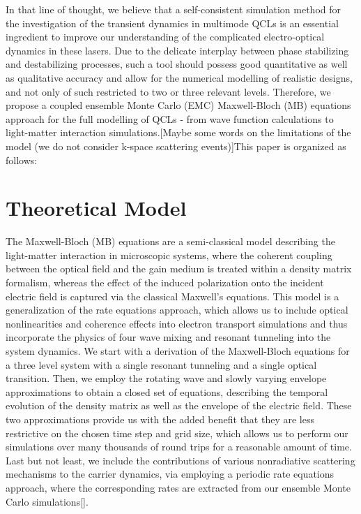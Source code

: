 \documentclass[10pt,letterpaper]{article}
\begin{document}
In that line of thought, we believe that a self-consistent simulation method for the investigation of the transient dynamics in multimode QCLs is an essential ingredient to improve our understanding of the complicated electro-optical dynamics in these lasers. Due to the delicate interplay between phase stabilizing and destabilizing processes, such a tool should possess good quantitative as well as qualitative accuracy and allow for the numerical modelling of realistic designs, and not only of such restricted to two or three relevant levels. Therefore, we propose a coupled ensemble Monte Carlo (EMC) Maxwell-Bloch (MB) equations approach for the full modelling of QCLs - from wave function calculations to light-matter interaction simulations.[Maybe some words on the limitations of the model (we do not consider k-space scattering events)]This paper is organized as follows:

\section{Theoretical Model}

The Maxwell-Bloch (MB) equations are a semi-classical model describing the light-matter interaction in microscopic systems, where the coherent coupling between the optical field and the gain medium is treated within a density matrix formalism, whereas the effect of the induced polarization onto the incident electric field is captured via the classical Maxwell's equations. This model is a generalization of the rate equations approach, which allows us to include optical nonlinearities and coherence effects into electron transport simulations and thus incorporate the physics of four wave mixing and resonant tunneling into the system dynamics. We start with a derivation of the Maxwell-Bloch equations for a three level system with a single resonant tunneling  and a single optical transition. Then, we employ the rotating wave and slowly varying envelope approximations to obtain a closed set of equations, describing the temporal evolution of the density matrix as well as the envelope of the electric field. These two approximations provide us with the added benefit that they are less restrictive on the chosen time step and grid size, which allows us to perform our simulations over many thousands of round trips for a reasonable amount of time. Last but not least, we include the contributions of various nonradiative scattering mechanisms to the carrier dynamics, via employing a periodic rate equations approach, where the corresponding rates are extracted from our ensemble Monte Carlo simulations[].
\end{document}
